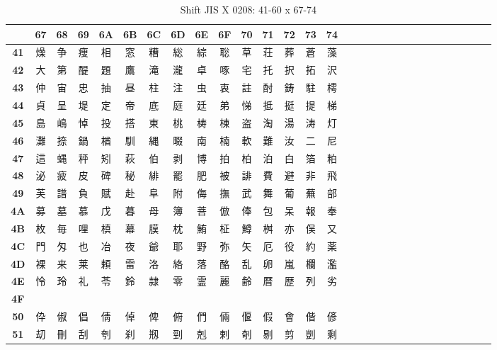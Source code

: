 \begin{table}[H]
\centering
\caption{Shift JIS X 0208: 41-60 x 67-74}
\begin{tabular}{|Sc|Sc|Sc|Sc|Sc|Sc|Sc|Sc|Sc|Sc|Sc|Sc|Sc|Sc|Sc|}
\hline
 & \textbf{67} & \textbf{68} & \textbf{69} & \textbf{6A} & \textbf{6B} & \textbf{6C} & \textbf{6D} & \textbf{6E} & \textbf{6F} & \textbf{70} & \textbf{71} & \textbf{72} & \textbf{73} & \textbf{74} \\ \hline
\textbf{41} & 燥 & 争 & 痩 & 相 & 窓 & 糟 & 総 & 綜 & 聡 & 草 & 荘 & 葬 & 蒼 & 藻 \\ \hline
\textbf{42} & 大 & 第 & 醍 & 題 & 鷹 & 滝 & 瀧 & 卓 & 啄 & 宅 & 托 & 択 & 拓 & 沢 \\ \hline
\textbf{43} & 仲 & 宙 & 忠 & 抽 & 昼 & 柱 & 注 & 虫 & 衷 & 註 & 酎 & 鋳 & 駐 & 樗 \\ \hline
\textbf{44} & 貞 & 呈 & 堤 & 定 & 帝 & 底 & 庭 & 廷 & 弟 & 悌 & 抵 & 挺 & 提 & 梯 \\ \hline
\textbf{45} & 島 & 嶋 & 悼 & 投 & 搭 & 東 & 桃 & 梼 & 棟 & 盗 & 淘 & 湯 & 涛 & 灯 \\ \hline
\textbf{46} & 灘 & 捺 & 鍋 & 楢 & 馴 & 縄 & 畷 & 南 & 楠 & 軟 & 難 & 汝 & 二 & 尼 \\ \hline
\textbf{47} & 這 & 蝿 & 秤 & 矧 & 萩 & 伯 & 剥 & 博 & 拍 & 柏 & 泊 & 白 & 箔 & 粕 \\ \hline
\textbf{48} & 泌 & 疲 & 皮 & 碑 & 秘 & 緋 & 罷 & 肥 & 被 & 誹 & 費 & 避 & 非 & 飛 \\ \hline
\textbf{49} & 芙 & 譜 & 負 & 賦 & 赴 & 阜 & 附 & 侮 & 撫 & 武 & 舞 & 葡 & 蕪 & 部 \\ \hline
\textbf{4A} & 募 & 墓 & 慕 & 戊 & 暮 & 母 & 簿 & 菩 & 倣 & 俸 & 包 & 呆 & 報 & 奉 \\ \hline
\textbf{4B} & 枚 & 毎 & 哩 & 槙 & 幕 & 膜 & 枕 & 鮪 & 柾 & 鱒 & 桝 & 亦 & 俣 & 又 \\ \hline
\textbf{4C} & 門 & 匁 & 也 & 冶 & 夜 & 爺 & 耶 & 野 & 弥 & 矢 & 厄 & 役 & 約 & 薬 \\ \hline
\textbf{4D} & 裸 & 来 & 莱 & 頼 & 雷 & 洛 & 絡 & 落 & 酪 & 乱 & 卵 & 嵐 & 欄 & 濫 \\ \hline
\textbf{4E} & 怜 & 玲 & 礼 & 苓 & 鈴 & 隷 & 零 & 霊 & 麗 & 齢 & 暦 & 歴 & 列 & 劣 \\ \hline
\textbf{4F} &  &  &  &  &  &  &  &  &  &  &  &  &  &  \\ \hline
\textbf{50} & 伜 & 俶 & 倡 & 倩 & 倬 & 俾 & 俯 & 們 & 倆 & 偃 & 假 & 會 & 偕 & 偐 \\ \hline
\textbf{51} & 刧 & 刪 & 刮 & 刳 & 刹 & 剏 & 剄 & 剋 & 剌 & 剞 & 剔 & 剪 & 剴 & 剩 \\ \hline

\end{tabular}
\end{table}
